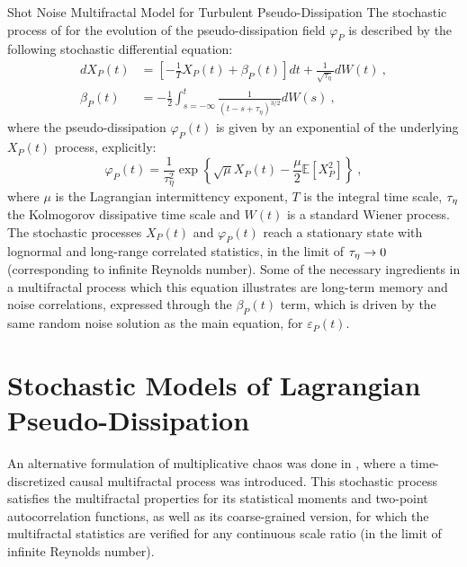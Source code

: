 \begin{chapter}{Shot Noise Multifractal Model for Turbulent Pseudo-Dissipation}
The stochastic process of \textcite{pereira2018multifractal} for the evolution of the pseudo-dissipation field $\varphi_P$ is described by the following stochastic differential equation:
\begin{equation} \label{eq:pereira-x}
\begin{split}
    d X_P(t)&=\left[-\frac{1}{T} X_P(t)+\beta_P(t)\right] d t+\frac{1}{\sqrt{\tau_{\eta}}} dW(t) \ , \\
    \beta_P(t)&=-\frac{1}{2} \int_{s=-\infty}^{t} \frac{1}{\left(t-s+\tau_{\eta}\right)^{3 / 2}} dW(s) \ ,
\end{split}
\end{equation}
where the pseudo-dissipation $\varphi_P(t)$ is given by an exponential of the underlying $X_P(t)$ process, explicitly:
\begin{equation}
    \varphi_P(t)=\frac{1}{\tau_{\eta}^{2}} \exp \left\{ \sqrt{\mu} X_P(t)-\frac{\mu}{2} \mathbb{E}\left[X_P^{2}\right] \right\} \ ,
\end{equation}
where $\mu$ is the Lagrangian intermittency exponent, $T$ is the integral time scale, $\tau_{\eta}$ the Kolmogorov dissipative time scale and $W(t)$ is a standard Wiener process.
The stochastic processes $X_P(t)$ and $\varphi_P(t)$ reach a stationary state with lognormal and long-range correlated statistics, in the limit of $\tau_{\eta} \to 0$ (corresponding to infinite Reynolds number). Some of the necessary ingredients in a multifractal process which this equation illustrates are long-term memory and noise correlations, expressed through the $\beta_P(t)$ term, which is driven by the same random noise solution as the main equation, for $\varepsilon_P(t)$.

\section{Stochastic Models of Lagrangian Pseudo-Dissipation} \label{sec:stoc-lag-dissip}

An alternative formulation of multiplicative chaos was done in \textcite{perpete2011}, where a time-discretized causal multifractal process was introduced. This stochastic process satisfies the multifractal properties for its statistical moments and two-point autocorrelation functions, as well as its coarse-grained version, for which the multifractal statistics are verified for any continuous scale ratio (in the limit of infinite Reynolds number).


\end{chapter}
